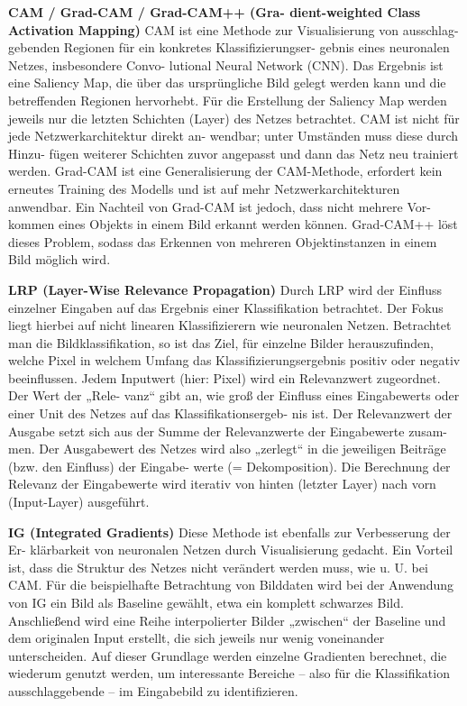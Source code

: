 \documentclass[11pt,a4paper]{article}
\numberwithin{equation}{section}
\begin{document}
	\noindent \textbf{CAM / Grad-CAM / Grad-CAM++ (Gra-
		dient-weighted Class Activation Mapping)}
	CAM ist eine Methode zur Visualisierung von ausschlag-
	gebenden Regionen für ein konkretes Klassifizierungser-
	gebnis eines neuronalen Netzes, insbesondere Convo-
	lutional Neural Network (CNN). Das Ergebnis ist eine
	Saliency Map, die über das ursprüngliche Bild gelegt
	werden kann und die betreffenden Regionen hervorhebt.
	Für die Erstellung der Saliency Map werden jeweils nur
	die letzten Schichten (Layer) des Netzes betrachtet.
	CAM ist nicht für jede Netzwerkarchitektur direkt an-
	wendbar; unter Umständen muss diese durch Hinzu-
	fügen weiterer Schichten zuvor angepasst und dann das
	Netz neu trainiert werden.
	Grad-CAM ist eine Generalisierung der CAM-Methode,
	erfordert kein erneutes Training des Modells und ist auf
	mehr Netzwerkarchitekturen anwendbar. Ein Nachteil
	von Grad-CAM ist jedoch, dass nicht mehrere Vor-
	kommen eines Objekts in einem Bild erkannt werden
	können. Grad-CAM++ löst dieses Problem, sodass das
	Erkennen von mehreren Objektinstanzen in einem Bild
	möglich wird.
	
	
	\noindent \textbf{LRP (Layer-Wise Relevance Propagation)}
	Durch LRP wird der Einfluss einzelner Eingaben auf das
	Ergebnis einer Klassifikation betrachtet. Der Fokus liegt
	hierbei auf nicht linearen Klassifizierern wie neuronalen
	Netzen. Betrachtet man die Bildklassifikation, so ist das
	Ziel, für einzelne Bilder herauszufinden, welche Pixel in
	welchem Umfang das Klassifizierungsergebnis positiv
	oder negativ beeinflussen. Jedem Inputwert (hier: Pixel)
	wird ein Relevanzwert zugeordnet. Der Wert der „Rele-
	vanz“ gibt an, wie groß der Einfluss eines Eingabewerts
	oder einer Unit des Netzes auf das Klassifikationsergeb-
	nis ist. Der Relevanzwert der Ausgabe setzt sich aus der
	Summe der Relevanzwerte der Eingabewerte zusam-
	men. Der Ausgabewert des Netzes wird also „zerlegt“ in
	die jeweiligen Beiträge (bzw. den Einfluss) der Eingabe-
	werte (= Dekomposition). Die Berechnung der Relevanz
	der Eingabewerte wird iterativ von hinten (letzter Layer)
	nach vorn (Input-Layer) ausgeführt.
	
	\noindent\textbf{IG (Integrated Gradients)}
	Diese Methode ist ebenfalls zur Verbesserung der Er-
	klärbarkeit von neuronalen Netzen durch Visualisierung
	gedacht. Ein Vorteil ist, dass die Struktur des Netzes
	nicht verändert werden muss, wie u. U. bei CAM. Für
	die beispielhafte Betrachtung von Bilddaten wird bei
	der Anwendung von IG ein Bild als Baseline gewählt,
	etwa ein komplett schwarzes Bild. Anschließend wird
	eine Reihe interpolierter Bilder „zwischen“ der Baseline
	und dem originalen Input erstellt, die sich jeweils nur
	wenig voneinander unterscheiden. Auf dieser Grundlage
	werden einzelne Gradienten berechnet, die wiederum
	genutzt werden, um interessante Bereiche – also für die
	Klassifikation ausschlaggebende – im Eingabebild zu
	identifizieren.
	
\end{document}
